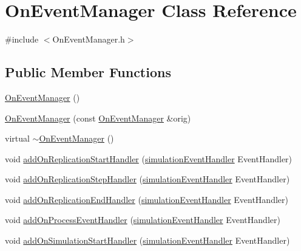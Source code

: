 \hypertarget{class_on_event_manager}{}\section{On\+Event\+Manager Class Reference}
\label{class_on_event_manager}


{\ttfamily \#include $<$On\+Event\+Manager.\+h$>$}

\subsection*{Public Member Functions}
\begin{DoxyCompactItemize}
\item 
\hyperlink{class_on_event_manager_a15f856c9d10d1c8fc002a7ec6f51bae9}{On\+Event\+Manager} ()
\item 
\hyperlink{class_on_event_manager_ae83cecca7e8a1f7d4e921cfa201c7fff}{On\+Event\+Manager} (const \hyperlink{class_on_event_manager}{On\+Event\+Manager} \&orig)
\item 
virtual \hyperlink{class_on_event_manager_aab0f5d9e7698be7860decf65e487de42}{$\sim$\+On\+Event\+Manager} ()
\item 
void \hyperlink{class_on_event_manager_a1158999e7be29735f364423f53afa1d7}{add\+On\+Replication\+Start\+Handler} (\hyperlink{_on_event_manager_8h_a0ad7c994fb1fe11b3233f273a4d8c813}{simulation\+Event\+Handler} Event\+Handler)
\item 
void \hyperlink{class_on_event_manager_a293e743d6f6fb1d21c68c197d8981436}{add\+On\+Replication\+Step\+Handler} (\hyperlink{_on_event_manager_8h_a0ad7c994fb1fe11b3233f273a4d8c813}{simulation\+Event\+Handler} Event\+Handler)
\item 
void \hyperlink{class_on_event_manager_a5ae277f0b557c1d76f1f12b759b526fb}{add\+On\+Replication\+End\+Handler} (\hyperlink{_on_event_manager_8h_a0ad7c994fb1fe11b3233f273a4d8c813}{simulation\+Event\+Handler} Event\+Handler)
\item 
void \hyperlink{class_on_event_manager_a90a19acb4fbf6b3986c45932335ee214}{add\+On\+Process\+Event\+Handler} (\hyperlink{_on_event_manager_8h_a0ad7c994fb1fe11b3233f273a4d8c813}{simulation\+Event\+Handler} Event\+Handler)
\item 
void \hyperlink{class_on_event_manager_afa1e09e03a1a853e7f5cb1a1427c705d}{add\+On\+Simulation\+Start\+Handler} (\hyperlink{_on_event_manager_8h_a0ad7c994fb1fe11b3233f273a4d8c813}{simulation\+Event\+Handler} Event\+Handler)
\item 

\end{DoxyCompactItemize}
